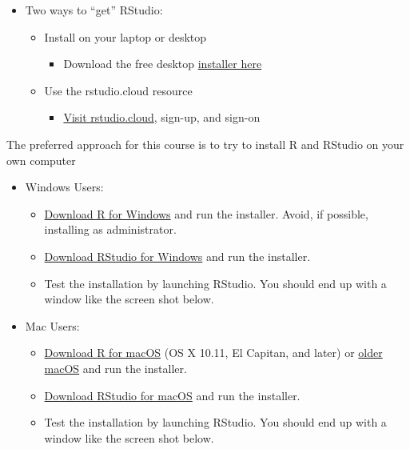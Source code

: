 \documentclass[
]{book}
\providecommand{\tightlist}{%
  \setlength{\itemsep}{0pt}\setlength{\parskip}{0pt}}
\begin{document}
\begin{itemize}
\tightlist
\item
  Two ways to ``get'' RStudio:

  \begin{itemize}
  \tightlist
  \item
    Install on your laptop or desktop

    \begin{itemize}
    \tightlist
    \item
      Download the free desktop \href{https://rstudio.com/products/rstudio/download/\#download}{installer here}
    \end{itemize}
  \item
    Use the rstudio.cloud resource

    \begin{itemize}
    \tightlist
    \item
      \href{https://rstudio.cloud/}{Visit rstudio.cloud}, sign-up, and sign-on
    \end{itemize}
  \end{itemize}
\end{itemize}

The preferred approach for this course is to try to install R and RStudio on your own computer

\begin{itemize}
\tightlist
\item
  Windows Users:

  \begin{itemize}
  \tightlist
  \item
    \href{https://cran.rstudio.com/bin/windows/base/R-3.6.3-win.exe}{Download R for Windows} and run the installer. Avoid, if possible, installing as administrator.
  \item
    \href{https://download1.rstudio.org/desktop/windows/RStudio-1.2.5033.exe}{Download RStudio for Windows} and run the installer.
  \item
    Test the installation by launching RStudio. You should end up with a window like the screen shot below.
  \end{itemize}
\item
  Mac Users:

  \begin{itemize}
  \tightlist
  \item
    \href{https://cran.rstudio.com/bin/macosx/R-3.6.3.pkg}{Download R for macOS} (OS X 10.11, El Capitan, and later) or \href{https://cran.rstudio.com/bin/macosx/R-3.6.3.nn.pkg}{older macOS} and run the installer.
  \item
    \href{https://download1.rstudio.org/desktop/macos/RStudio-1.2.5033.dmg}{Download RStudio for macOS} and run the installer.
  \item
    Test the installation by launching RStudio. You should end up with a window like the screen shot below.
  \end{itemize}
\end{itemize}
\end{document}
